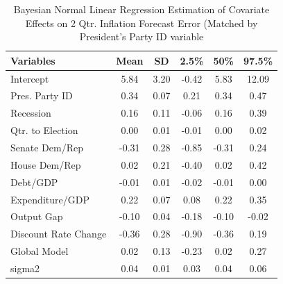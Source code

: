 \documentclass[a4paper]{article}\usepackage{graphicx, color}
\begin{document}
\begin{table}[ht]
\begin{center}
\caption{Bayesian Normal Linear Regression Estimation of Covariate Effects on 2 Qtr. Inflation Forecast Error (Matched by President's Party ID variable}
\label{OutputPB}
{\small
\begin{tabular}{lccccc}
  \hline
Variables & Mean & SD & 2.5\% & 50\% & 97.5\% \\ 
  \hline
Intercept & 5.84 & 3.20 & -0.42 & 5.83 & 12.09 \\ 
  Pres. Party ID & 0.34 & 0.07 & 0.21 & 0.34 & 0.47 \\ 
  Recession & 0.16 & 0.11 & -0.06 & 0.16 & 0.39 \\ 
  Qtr. to Election & 0.00 & 0.01 & -0.01 & 0.00 & 0.02 \\ 
  Senate Dem/Rep & -0.31 & 0.28 & -0.85 & -0.31 & 0.24 \\ 
  House Dem/Rep & 0.02 & 0.21 & -0.40 & 0.02 & 0.42 \\ 
  Debt/GDP & -0.01 & 0.01 & -0.02 & -0.01 & 0.00 \\ 
  Expenditure/GDP & 0.22 & 0.07 & 0.08 & 0.22 & 0.35 \\ 
  Output Gap & -0.10 & 0.04 & -0.18 & -0.10 & -0.02 \\ 
  Discount Rate Change & -0.36 & 0.28 & -0.90 & -0.36 & 0.19 \\ 
  Global Model & 0.02 & 0.13 & -0.23 & 0.02 & 0.27 \\ 
  sigma2 & 0.04 & 0.01 & 0.03 & 0.04 & 0.06 \\ 
   \hline
\end{tabular}
}
\end{center}
\end{table}





\clearpage



\end{document}
